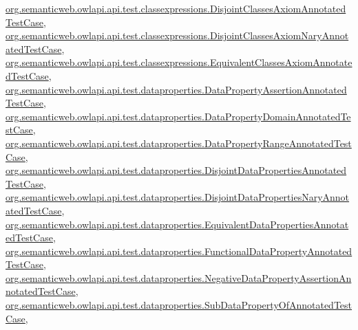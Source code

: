 \hyperlink{classorg_1_1semanticweb_1_1owlapi_1_1api_1_1test_1_1classexpressions_1_1_disjoint_classes_axiom_annotated_test_case_aa7738e497f01f721ccd9a110811df3ae}{org.\-semanticweb.\-owlapi.\-api.\-test.\-classexpressions.\-Disjoint\-Classes\-Axiom\-Annotated\-Test\-Case}, \hyperlink{classorg_1_1semanticweb_1_1owlapi_1_1api_1_1test_1_1classexpressions_1_1_disjoint_classes_axiom_nary_annotated_test_case_a99a16f6ef0ef726c62c3bf65d4d1388e}{org.\-semanticweb.\-owlapi.\-api.\-test.\-classexpressions.\-Disjoint\-Classes\-Axiom\-Nary\-Annotated\-Test\-Case}, \hyperlink{classorg_1_1semanticweb_1_1owlapi_1_1api_1_1test_1_1classexpressions_1_1_equivalent_classes_axiom_annotated_test_case_ad1e578eddb09dd99201d8fbe995cee84}{org.\-semanticweb.\-owlapi.\-api.\-test.\-classexpressions.\-Equivalent\-Classes\-Axiom\-Annotated\-Test\-Case}, \hyperlink{classorg_1_1semanticweb_1_1owlapi_1_1api_1_1test_1_1dataproperties_1_1_data_property_assertion_annotated_test_case_a3c18a69f682b42fc177d567598b0f268}{org.\-semanticweb.\-owlapi.\-api.\-test.\-dataproperties.\-Data\-Property\-Assertion\-Annotated\-Test\-Case}, \hyperlink{classorg_1_1semanticweb_1_1owlapi_1_1api_1_1test_1_1dataproperties_1_1_data_property_domain_annotated_test_case_aabba05e379f13c80714e6fa7b8e660bf}{org.\-semanticweb.\-owlapi.\-api.\-test.\-dataproperties.\-Data\-Property\-Domain\-Annotated\-Test\-Case}, \hyperlink{classorg_1_1semanticweb_1_1owlapi_1_1api_1_1test_1_1dataproperties_1_1_data_property_range_annotated_test_case_ad0f1b738b8f59866387e9c2fd71b544b}{org.\-semanticweb.\-owlapi.\-api.\-test.\-dataproperties.\-Data\-Property\-Range\-Annotated\-Test\-Case}, \hyperlink{classorg_1_1semanticweb_1_1owlapi_1_1api_1_1test_1_1dataproperties_1_1_disjoint_data_properties_annotated_test_case_adb945ddfd6c642c3f49b6d39f78d9957}{org.\-semanticweb.\-owlapi.\-api.\-test.\-dataproperties.\-Disjoint\-Data\-Properties\-Annotated\-Test\-Case}, \hyperlink{classorg_1_1semanticweb_1_1owlapi_1_1api_1_1test_1_1dataproperties_1_1_disjoint_data_properties_nary_annotated_test_case_a8bcadc75d9b881ce35ebe9192381a6fe}{org.\-semanticweb.\-owlapi.\-api.\-test.\-dataproperties.\-Disjoint\-Data\-Properties\-Nary\-Annotated\-Test\-Case}, \hyperlink{classorg_1_1semanticweb_1_1owlapi_1_1api_1_1test_1_1dataproperties_1_1_equivalent_data_properties_annotated_test_case_ae6486da458b6d8211599b52cfc17212a}{org.\-semanticweb.\-owlapi.\-api.\-test.\-dataproperties.\-Equivalent\-Data\-Properties\-Annotated\-Test\-Case}, \hyperlink{classorg_1_1semanticweb_1_1owlapi_1_1api_1_1test_1_1dataproperties_1_1_functional_data_property_annotated_test_case_a1c23c5610dfe5d7939a9643faef17ba4}{org.\-semanticweb.\-owlapi.\-api.\-test.\-dataproperties.\-Functional\-Data\-Property\-Annotated\-Test\-Case}, \hyperlink{classorg_1_1semanticweb_1_1owlapi_1_1api_1_1test_1_1dataproperties_1_1_negative_data_property_assertion_annotated_test_case_ac154dbb2e87b44c2b08186d258112370}{org.\-semanticweb.\-owlapi.\-api.\-test.\-dataproperties.\-Negative\-Data\-Property\-Assertion\-Annotated\-Test\-Case}, \hyperlink{classorg_1_1semanticweb_1_1owlapi_1_1api_1_1test_1_1dataproperties_1_1_sub_data_property_of_annotated_test_case_ab450245b417d5cd2a60de658f89366eb}{org.\-semanticweb.\-owlapi.\-api.\-test.\-dataproperties.\-Sub\-Data\-Property\-Of\-Annotated\-Test\-Case}, 